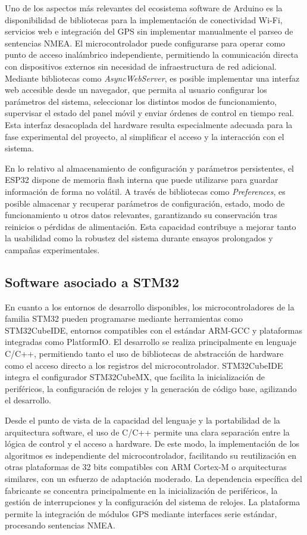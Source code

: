 Uno de los aspectos más relevantes del ecosistema software de Arduino es la disponibilidad de bibliotecas para la implementación de conectividad Wi-Fi, servicios web e integración del GPS sin implementar manualmente el parseo de sentencias NMEA. El microcontrolador puede configurarse para operar como punto de acceso inalámbrico independiente, permitiendo la comunicación directa con dispositivos externos sin necesidad de infraestructura de red adicional. Mediante bibliotecas como \textit{AsyncWebServer}, es posible implementar una interfaz web accesible desde un navegador, que permita al usuario configurar los parámetros del sistema, seleccionar los distintos modos de funcionamiento, supervisar el estado del panel móvil y enviar órdenes de control en tiempo real. Esta interfaz desacoplada del hardware resulta especialmente adecuada para la fase experimental del proyecto, al simplificar el acceso y la interacción con el sistema.

En lo relativo al almacenamiento de configuración y parámetros persistentes, el ESP32 dispone de memoria flash interna que puede utilizarse para guardar información de forma no volátil. A través de bibliotecas como \textit{Preferences}, es posible almacenar y recuperar parámetros de configuración, estado, modo de funcionamiento u otros datos relevantes, garantizando su conservación tras reinicios o pérdidas de alimentación. Esta capacidad contribuye a mejorar tanto la usabilidad como la robustez del sistema durante ensayos prolongados y campañas experimentales.


\subsection{Software asociado a STM32}

En cuanto a los entornos de desarrollo disponibles, los microcontroladores de la familia STM32 pueden programarse mediante herramientas como STM32CubeIDE, entornos compatibles con el estándar ARM-GCC y plataformas integradas como PlatformIO. El desarrollo se realiza principalmente en lenguaje C/C++, permitiendo tanto el uso de bibliotecas de abstracción de hardware como el acceso directo a los registros del microcontrolador. STM32CubeIDE integra el configurador STM32CubeMX, que facilita la inicialización de periféricos, la configuración de relojes y la generación de código base, agilizando el desarrollo.

Desde el punto de vista de la capacidad del lenguaje y la portabilidad de la arquitectura software, el uso de C/C++ permite una clara separación entre la lógica de control y el acceso a hardware. De este modo, la implementación de los algoritmos es independiente del microcontrolador, facilitando su reutilización en otras plataformas de 32 bits compatibles con ARM Cortex-M o arquitecturas similares, con un esfuerzo de adaptación moderado. La dependencia específica del fabricante se concentra principalmente en la inicialización de periféricos, la gestión de interrupciones y la configuración del sistema de relojes. La plataforma permite la integración de módulos GPS mediante interfaces serie estándar, procesando sentencias NMEA. 

